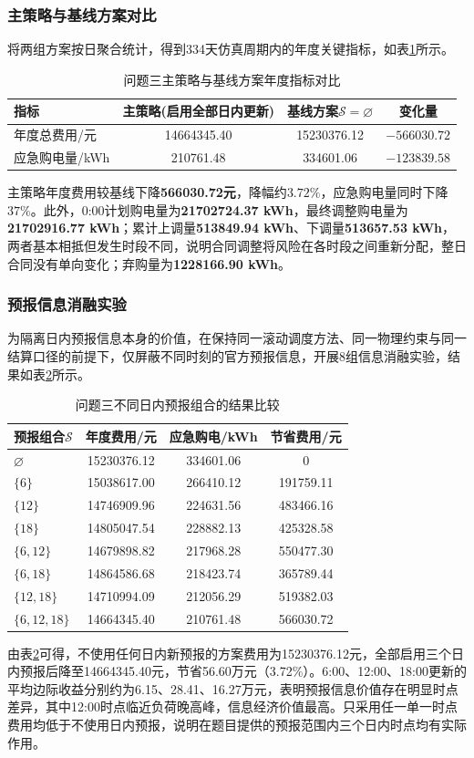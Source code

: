 \subsubsection{主策略与基线方案对比}
将两组方案按日聚合统计，得到334天仿真周期内的年度关键指标，如表\ref{tab:q3_compare}所示。
\begin{table}[htbp]
\centering
\caption{问题三主策略与基线方案年度指标对比}
\label{tab:q3_compare}
\scriptsize
\begin{tabular}{lccc}
\toprule
指标 & 主策略(启用全部日内更新) & 基线方案$\mathcal{S}=\varnothing$ & 变化量 \\ 
\midrule
年度总费用/元 & 14664345.40 & 15230376.12 & $-566030.72$ \\
应急购电量/kWh & 210761.48 & 334601.06 & $-123839.58$ \\
\bottomrule
\end{tabular}
\end{table}
主策略年度费用较基线下降\textbf{566030.72元}，降幅约$3.72\%$，应急购电量同时下降$37\%$。此外，0:00计划购电量为\textbf{21702724.37 kWh}，最终调整购电量为\textbf{21702916.77 kWh}；累计上调量\textbf{513849.94 kWh}、下调量\textbf{513657.53 kWh}，两者基本相抵但发生时段不同，说明合同调整将风险在各时段之间重新分配，整日合同没有单向变化；弃购量为\textbf{1228166.90 kWh}。

\subsubsection{预报信息消融实验}
为隔离日内预报信息本身的价值，在保持同一滚动调度方法、同一物理约束与同一结算口径的前提下，仅屏蔽不同时刻的官方预报信息，开展8组信息消融实验，结果如表\ref{tab:q3_ablation}所示。
\begin{table}[htbp]
\centering
\caption{问题三不同日内预报组合的结果比较}
\label{tab:q3_ablation}
\scriptsize
\begin{tabular}{lccc}
\toprule
预报组合$\mathcal{S}$ & 年度费用/元 & 应急购电/kWh & 节省费用/元 \\ 
\midrule
$\varnothing$ & 15230376.12 & 334601.06 & 0 \\
$\{6\}$ & 15038617.00 & 266410.12 & 191759.11 \\
$\{12\}$ & 14746909.96 & 224631.56 & 483466.16 \\
$\{18\}$ & 14805047.54 & 228882.13 & 425328.58 \\
$\{6,12\}$ & 14679898.82 & 217968.28 & 550477.30 \\
$\{6,18\}$ & 14864586.68 & 218423.74 & 365789.44 \\
$\{12,18\}$ & 14710994.09 & 212056.29 & 519382.03 \\
$\{6,12,18\}$ & 14664345.40 & 210761.48 & 566030.72 \\
\bottomrule
\end{tabular}
\end{table}
由表\ref{tab:q3_ablation}可得，不使用任何日内新预报的方案费用为15230376.12元，全部启用三个日内预报后降至14664345.40元，节省56.60万元（3.72\%）。6:00、12:00、18:00更新的平均边际收益分别约为6.15、28.41、16.27万元，表明预报信息价值存在明显时点差异，其中12:00时点临近负荷晚高峰，信息经济价值最高。只采用任一单一时点费用均低于不使用日内预报，说明在题目提供的预报范围内三个日内时点均有实际作用。

